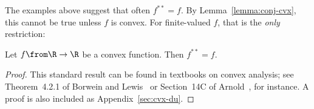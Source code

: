 The examples above suggest that often $f^{**} = f$.  By
Lemma~\ref{lemma:conj-cvx}, this cannot be true unless $f$ is convex.  For
finite-valued $f$, that is the \emph{only} restriction:

\begin{thm}
%
%
%
% 
Let $f \from \R \to \R$ be a convex function.  Then $f^{**} = f$.
\end{thm}

\begin{proof}
This standard result can be found in textbooks on convex analysis; see
Theorem~4.2.1 of Borwein and Lewis~\cite{BoLe} or Section~14C of
Arnold~\cite{Arno}, for instance.  A proof is also included as
Appendix~\ref{sec:cvx-du}.
\end{proof}


